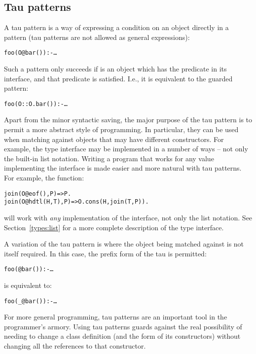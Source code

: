 \subsection{Tau patterns}
\label{expression:tau}
A tau pattern is a way of expressing a condition on an object directly in a pattern (tau patterns are not allowed as general expressions):
\begin{alltt}
foo(O@bar()) :- \ldots
\end{alltt}
Such a pattern only succeeds if  is an object which has the  predicate in its interface, and that predicate is satisfied. I.e., it is equivalent to the guarded pattern:
\begin{alltt}
foo(O::O.bar()) :- \ldots
\end{alltt}
Apart from the minor syntactic saving, the major purpose of the tau pattern is to permit a more abstract style of programming. In particular, they can be used when matching against objects that may have different constructors. For example, the  type interface may be implemented in a number of ways -- not only the built-in list notation. Writing a program that works for any value implementing the  interface is made easier and more natural with tau patterns. For example, the  function:
\begin{alltt}
join(O@eof(),P) => P.
join(O@hdtl(H,T),P) => O.cons(H,join(T,P)).
\end{alltt}
will work with \emph{any} implementation of the  interface, not only the list notation. See Section~\vref{types:list} for a more complete description of the  type interface.

A variation of the tau pattern is where the object being matched against is not itself required. In this case, the prefix form of the tau is permitted:
\begin{alltt}
foo(@bar()) :- \ldots
\end{alltt}
is equivalent to:
\begin{alltt}
foo(\_@bar()) :- \ldots
\end{alltt}

\begin{aside}
For more general programming, tau patterns are an important tool in the programmer's armory. Using tau patterns guards against the real possibility of needing to change a class definition (and the form of its constructors) without changing all the references to that constructor.
\end{aside}

